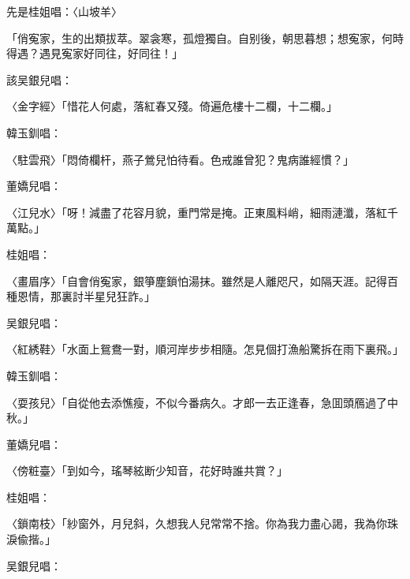 先是桂姐唱：〈山坡羊〉
\begin{myquote}
「俏寃家，生的出類拔萃。翠衾寒，孤燈獨自。自别後，朝思暮想；想寃家，何時得遇？遇見寃家好同往，好同往！」
\end{myquote}

該吴銀兒唱：

\begin{myquote}
{\markfont〈金字經〉}「惜花人何處，落紅春又殘。倚遍危樓十二欄，十二欄。」
\end{myquote}

韓玉釧唱：

\begin{myquote}
{\markfont〈駐雲飛〉}「悶倚欄杆，燕子鶯兒怕待看。色戒誰曾犯？鬼病誰經慣？」
\end{myquote}

董嬌兒唱：

\begin{myquote}
{\markfont〈江兒水〉}「呀！減盡了花容月貌，重門常是掩。正東風料峭，細雨漣瀸，落紅千萬點。」
\end{myquote}

桂姐唱：

\begin{myquote}
{\markfont〈畫眉序〉}「自會俏寃家，銀箏塵鎖怕湯抹。雖然是人離咫尺，如隔天涯。記得百種恩情，那裏討半星兒狂詐。」
\end{myquote}

吴銀兒唱：

\begin{myquote}
{\markfont〈紅綉鞋〉}「水面上鴛鴦一對，順河岸步步相隨。怎見個打漁船驚拆在雨下裏飛。」
\end{myquote}

韓玉釧唱：

\begin{myquote}
{\markfont〈耍孩兒〉}「自從他去添憔瘦，不似今番病久。才郎一去正逢春，急囬頭鴈過了中秋。」
\end{myquote}

董嬌兒唱：

\begin{myquote}
{\markfont〈傍粧臺〉}「到如今，瑤琴絃断少知音，花好時誰共賞？」
\end{myquote}

桂姐唱：

\begin{myquote}
{\markfont〈鎖南枝〉}「紗窗外，月兒斜，久想我人兒常常不捨。你為我力盡心謁，我為你珠淚偸揩。」
\end{myquote}

吴銀兒唱：

